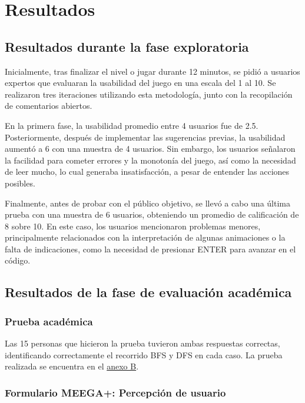 \chapter{Resultados}

\section{Resultados durante la fase exploratoria}

Inicialmente, tras finalizar el nivel o jugar durante 12 minutos, se pidió a usuarios expertos que evaluaran la usabilidad del juego en una escala del 1 al 10. Se realizaron tres iteraciones utilizando esta metodología, junto con la recopilación de comentarios abiertos. 

En la primera fase, la usabilidad promedio entre 4 usuarios fue de 2.5. Posteriormente, después de implementar las sugerencias previas, la usabilidad aumentó a 6 con una muestra de 4 usuarios. Sin embargo, los usuarios señalaron la facilidad para cometer errores y la monotonía del juego, así como la necesidad de leer mucho, lo cual generaba insatisfacción, a pesar de entender las acciones posibles.

Finalmente, antes de probar con el público objetivo, se llevó a cabo una última prueba con una muestra de 6 usuarios, obteniendo un promedio de calificación de 8 sobre 10. En este caso, los usuarios mencionaron problemas menores, principalmente relacionados con la interpretación de algunas animaciones o la falta de indicaciones, como la necesidad de presionar ENTER para avanzar en el código.

\section{Resultados de la fase de evaluación académica}

\subsection{Prueba académica}

Las 15 personas que hicieron la prueba tuvieron ambas respuestas correctas, identificando correctamente el recorrido BFS y DFS en cada caso. La prueba realizada se encuentra en el \hyperref[AnexoB]{anexo B}.

\subsection{Formulario MEEGA+: Percepción de usuario}

